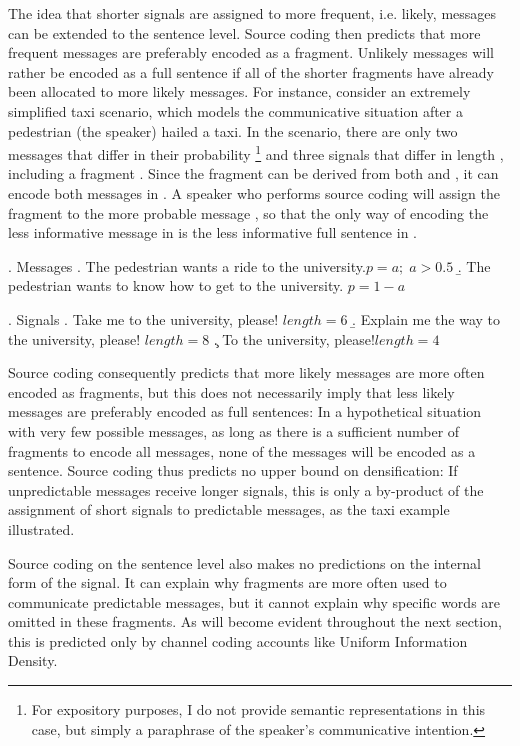 The idea that shorter signals are assigned to more frequent, i.e. likely, messages can be extended to the sentence level. Source coding then predicts that more frequent messages are preferably encoded as a fragment. Unlikely messages will rather be encoded as a full sentence if all of the shorter fragments have already been allocated to more likely messages. For instance, consider an extremely simplified taxi scenario, which models the communicative situation after a pedestrian (the speaker) hailed a taxi. In the scenario, there are only two messages that differ in their probability \Next%
%
\footnote{For expository purposes, I do not provide semantic representations in this case, but simply a paraphrase of the speaker's communicative intention.}\afterfn%
% 
and three signals that differ in length \NNext, including a fragment \NNext[c]. Since the fragment can be derived from both \NNext[a] and \NNext[b], it can encode both messages in \Next. A speaker who performs source coding will assign the fragment to the more probable message \Next[a], so that the only way of encoding the less informative message in \Next[b] is the less informative full sentence in \Next[b].

\ex. Messages
\a. The pedestrian wants a ride to the university.\hfill $p = a;\;a > 0.5$
     \b. The pedestrian wants to know how to get to the university. \hfill$p = 1-a$

\ex. Signals
\a. Take me to the university, please! \hfill $length = 6$
     \b. Explain me the way to the university, please! \hfill $length = 8$
     \c. To the university, please!\hfill $length = 4$

Source coding consequently predicts that more likely messages are more often encoded as fragments, but this does not necessarily imply that less likely messages are preferably encoded as full sentences: In a hypothetical situation with very few possible messages, as long as there is a sufficient number of fragments to encode all messages, none of the messages will be encoded as a sentence. Source coding thus predicts no upper bound on densification: If unpredictable messages receive longer signals, this is only a by-product of the assignment of short signals to predictable messages, as the taxi example illustrated.

Source coding on the sentence level also makes no predictions on the internal form of the signal. It can explain why fragments are more often used to communicate predictable messages, but it cannot explain why specific words are omitted in these fragments. As will become evident throughout the next section, this is predicted only by channel coding accounts like Uniform Information Density.

